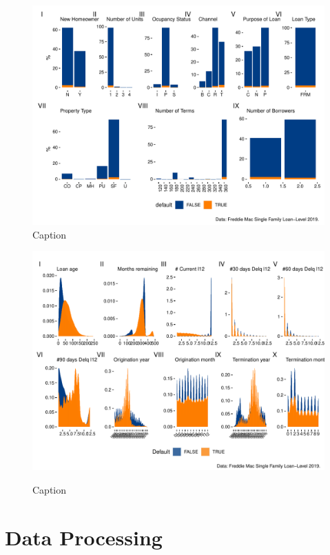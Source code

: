 \begin{figure}[H]
    \centering
    \includegraphics[width = \textwidth]{Figures/pw_4.pdf}
    \caption{Caption}
    \label{fig:my_label}
\end{figure}



\begin{figure}[H]
    \centering
    \includegraphics[width = \textwidth]{Figures/pw_7.pdf}
    \label{fig:my_label}
    \caption{Caption}
\end{figure}

        
\section{Data Processing}
    
